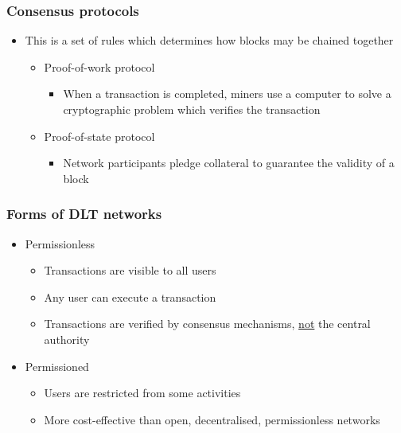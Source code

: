 \documentclass[../notes_compiled.tex]{subfiles}
\begin{document}
\subsubsection*{Consensus protocols}
\begin{itemize}
\item This is a set of rules which determines how blocks may be chained together
\begin{itemize}
\item Proof-of-work protocol
\begin{itemize}
\item When a transaction is completed, miners use a computer to solve a cryptographic problem which verifies the transaction
\end{itemize}
\item Proof-of-state protocol
\begin{itemize}
\item Network participants pledge collateral to guarantee the validity of a block
\end{itemize}
\end{itemize}
\end{itemize}

\subsubsection*{Forms of DLT networks}
\begin{itemize}
\item Permissionless
\begin{itemize}
\item Transactions are visible to all users
\item Any user can execute a transaction
\item Transactions are verified by consensus mechanisms, \underline{not} the central authority
\end{itemize}
\item Permissioned
\begin{itemize}
\item Users are restricted from some activities
\item More cost-effective than open, decentralised, permissionless networks
\end{itemize}
\end{itemize}
\end{document}
